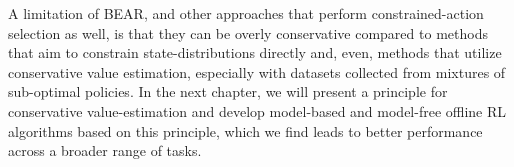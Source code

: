  A limitation of BEAR, and other approaches that perform constrained-action selection as well, is that they can be overly conservative compared to methods that aim to constrain state-distributions directly and, even, methods that utilize conservative value estimation, especially with datasets collected from mixtures of sub-optimal policies. In the next chapter, we will present a principle for conservative value-estimation and develop model-based and model-free offline RL algorithms based on this principle, which we find leads to better performance across a broader range of tasks.  

